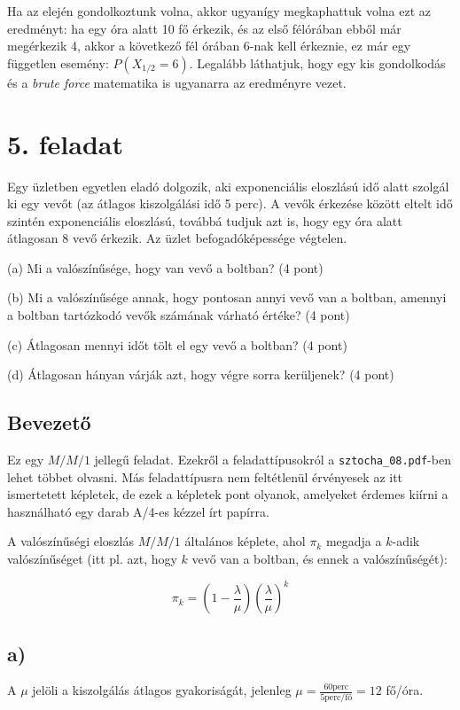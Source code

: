 \documentclass[a4paper,12pt]{article}
\begin{document}
Ha az elején gondolkoztunk volna, akkor ugyanígy megkaphattuk volna ezt az 
eredményt: ha egy óra alatt 10 fő érkezik, és az első félórában ebből már
megérkezik 4, akkor a következő fél órában 6-nak kell érkeznie, ez már 
egy független esemény: $P(X_{1/2} = 6)$. Legalább láthatjuk, hogy egy kis
gondolkodás és a \textit{brute force} matematika is ugyanarra az 
eredményre vezet.

\pagebreak
\section*{5. feladat}
Egy üzletben egyetlen eladó dolgozik, aki exponenciális eloszlású idő 
alatt szolgál ki egy vevőt (az átlagos kiszolgálási idő 5 perc). A vevők
érkezése között eltelt idő  szintén exponenciális eloszlású, továbbá 
tudjuk azt is, hogy egy óra alatt átlagosan 8 vevő érkezik. Az üzlet 
befogadóképessége végtelen.

(a) Mi a valószínűsége, hogy van vevő a boltban? (4 pont)

(b) Mi a valószínűsége annak, hogy pontosan annyi vevő van a boltban, 
amennyi a boltban tartózkodó vevők számának várható értéke? (4 pont)

(c) Átlagosan mennyi időt tölt el egy vevő a boltban? (4 pont)

(d) Átlagosan hányan várják azt, hogy végre sorra kerüljenek? (4 pont)

\subsection*{Bevezető}
Ez egy $M/M/1$ jellegű feladat. Ezekről a feladattípusokról a
\mbox{\texttt{sztocha\_08.pdf}}-ben lehet többet olvasni. Más 
feladattípusra nem feltétlenül érvényesek az itt ismertetett képletek,
de ezek a képletek pont olyanok, amelyeket érdemes kiírni a
használható egy darab A/4-es kézzel írt papírra.

A valószínűségi eloszlás $M/M/1$ általános képlete, ahol $\pi_k$ megadja
a $k$-adik valószínűséget (itt pl. azt, hogy $k$ vevő van a boltban, és
ennek a valószínűségét):

\[
\pi_k = \left( 1 - \frac{\lambda}{\mu} \right) 
\left( \frac{\lambda}{\mu} \right)^k
\]

\subsection*{a)}
A $\mu$ jelöli a kiszolgálás átlagos gyakoriságát, jelenleg 
$\mu = \frac{60 \text{perc}}{5 \text{perc/fő}} = 12$ fő/óra.
\end{document}

